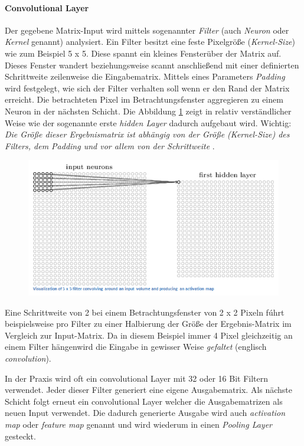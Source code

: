 \paragraph{Convolutional Layer}
Der gegebene Matrix-Input wird mittels sogenannter \emph{Filter} (auch \emph{Neuron} oder \emph{Kernel} genannt) analysiert. Ein Filter besitzt eine feste Pixelgröße (\emph{Kernel-Size}) wie zum Beispiel 5 x 5. Diese spannt ein kleines \glqq Fenster\grqq  über der Matrix auf. Dieses Fenster wandert beziehungsweise scannt anschließend mit einer definierten Schrittweite zeilenweise die Eingabematrix. Mittels eines Parameters \emph{Padding} wird festgelegt, wie sich der Filter verhalten soll wenn er den Rand der Matrix erreicht. Die betrachteten Pixel im Betrachtungsfenster aggregieren zu einem Neuron in der nächsten Schicht. Die Abbildung \ref{fig:cnn_convLayer} zeigt in relativ verständlicher Weise wie der sogenannte erste \emph{hidden Layer} dadurch aufgebaut wird. Wichtig: \emph{Die Größe dieser Ergebnismatrix ist abhängig von der Größe (Kernel-Size) des Filters, dem Padding und vor allem von der Schrittweite} \cite{cnnFunktionsweise2}. 

\begin{figure}[!htb]
	\centering
	\includegraphics[width=.6\linewidth]{img/cnn_convLayer}
	\label{fig:cnn_convLayer}
\end{figure}

Eine Schrittweite von 2 bei einem Betrachtungsfenster von 2 x 2 Pixeln fúhrt beispielsweise pro Filter zu einer Halbierung der Größe der Ergebnis-Matrix im Vergleich zur Input-Matrix. Da in diesem Beispiel immer 4 Pixel gleichzeitig an einem Filter \glqq hängen\grqq  wird die Eingabe in gewisser Weise \emph{gefaltet} (englisch \emph{convolution}). 

In der Praxis wird oft ein convolutional Layer mit 32 oder 16 Bit Filtern verwendet. Jeder dieser Filter generiert eine eigene Ausgabematrix. Als nächste Schicht folgt erneut ein convolutional Layer welcher die Ausgabematrizen als neuen Input verwendet. Die dadurch generierte Ausgabe wird auch \emph{activation map} oder \emph{feature map} genannt und wird wiederum in einen \emph{Pooling Layer} gesteckt. 

